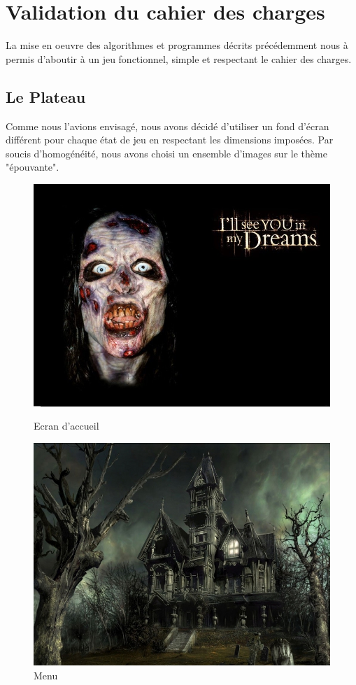 \section{Validation du cahier des charges} 
La mise en oeuvre des algorithmes et programmes décrits précédemment nous à permis d'aboutir à un jeu fonctionnel, simple et respectant le cahier des charges.

\subsection{Le Plateau}

Comme nous l'avions envisagé, nous avons décidé d'utiliser un fond d'écran différent pour chaque état de jeu en respectant les dimensions imposées. Par soucis d'homogénéité, nous avons choisi un ensemble d'images sur le thème "épouvante".
\begin{figure}[H]
   \begin{minipage}[c]{.46\linewidth}
      \includegraphics[scale=0.3]{img/backgroundaccueil.png}
			 \caption {Ecran d'accueil} 
   \end{minipage} \hfil
   \begin{minipage}[c]{.46\linewidth}
      \includegraphics[scale=0.83]{img/maison.jpg}
			\caption {Menu} 
   \end{minipage}
\end{figure}
